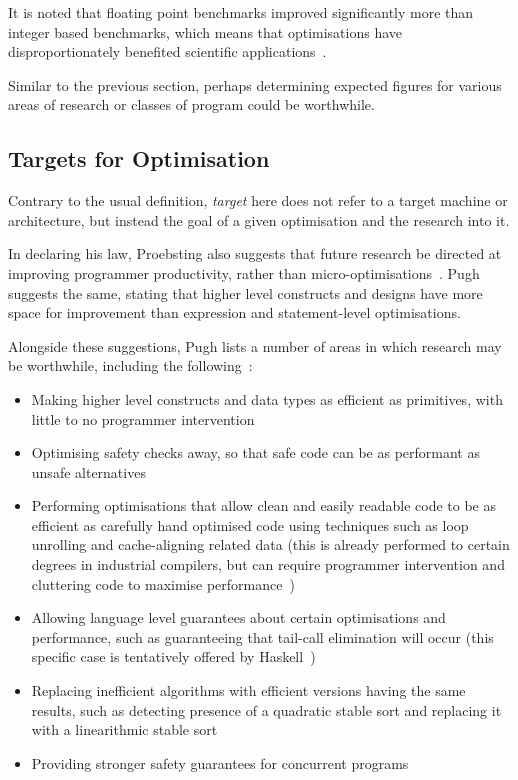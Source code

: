 It is noted that floating point benchmarks improved significantly more than integer based benchmarks, which means that optimisations have disproportionately benefited scientific applications~\cite{proebstingformal}.

Similar to the previous section, perhaps determining expected figures for various areas of research or classes of program could be worthwhile.

\subsection{Targets for Optimisation}

Contrary to the usual definition, \textit{target} here does not refer to a target machine or architecture, but instead the goal of a given optimisation and the research into it.

In declaring his law, Proebsting also suggests that future research be directed at improving programmer productivity, rather than micro-optimisations~\cite{proebstingdecl}. Pugh suggests the same, stating that higher level constructs and designs have more space for improvement than expression and statement-level optimisations.

Alongside these suggestions, Pugh lists a number of areas in which research may be worthwhile, including the following~\cite{optimisationrelevant}:

\begin{itemize}
	\itemsep-0.25em
	\item Making higher level constructs and data types as efficient as primitives, with little to no programmer intervention
	\item Optimising safety checks away, so that safe code can be as performant as unsafe alternatives
	\item Performing optimisations that allow clean and easily readable code to be as efficient as carefully hand optimised code using techniques such as loop unrolling and cache-aligning related data (this is already performed to certain degrees in industrial compilers, but can require programmer intervention and cluttering code to maximise performance~\cite{gccloops})
	\item Allowing language level guarantees about certain optimisations and performance, such as guaranteeing that tail-call elimination will occur (this specific case is tentatively offered by Haskell~\cite{haskelltail})
	\item Replacing inefficient algorithms with efficient versions having the same results, such as detecting presence of a quadratic stable sort and replacing it with a linearithmic stable sort
	\item Providing stronger safety guarantees for concurrent programs
\end{itemize}

